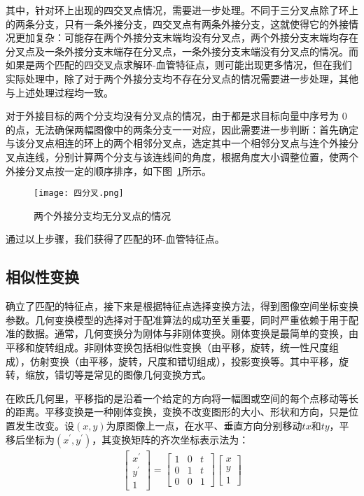 其中，针对环上出现的四交叉点情况，需要进一步处理。不同于三分叉点除了环上的两条分支，只有一条外接分支，四交叉点有两条外接分支，这就使得它的外接情况更加复杂：可能存在两个外接分支末端均没有分叉点，两个外接分支末端均存在分叉点及一条外接分支末端存在分叉点，一条外接分支末端没有分叉点的情况。而如果是两个匹配的四交叉点求解环-血管特征点，则可能出现更多情况，但在我们实际处理中，除了对于两个外接分支均不存在分叉点的情况需要进一步处理，其他与上述处理过程均一致。

对于外接目标的两个分支均没有分叉点的情况，由于都是求目标向量中序号为 0 的点，无法确保两幅图像中的两条分支一一对应，因此需要进一步判断：首先确定与该分叉点相连的环上的两个相邻分叉点，选定其中一个相邻分叉点与连个外接分叉点连线，分别计算两个分支与该连线间的角度，根据角度大小调整位置，使两个外接分叉点按一定的顺序排序，如下图~\ref{4bifur}所示。
   \begin{figure}[ht!]
   \centering
  \texttt{[image: 四分叉.png]}
  \caption{两个外接分支均无分叉点的情况}
  \label{4bifur}
 \end{figure}
通过以上步骤，我们获得了匹配的环-血管特征点。

\subsection{相似性变换}
确立了匹配的特征点，接下来是根据特征点选择变换方法，得到图像空间坐标变换参数。几何变换模型的选择对于配准算法的成功至关重要，同时严重依赖于用于配准的数据。通常，几何变换分为刚体与非刚体变换。刚体变换是最简单的变换，由平移和旋转组成。非刚体变换包括相似性变换（由平移，旋转，统一性尺度组成），仿射变换（由平移，旋转，尺度和错切组成），投影变换等。其中平移，旋转，缩放，错切等是常见的图像几何变换方式。 

在欧氏几何里，平移指的是沿着一个给定的方向将一幅图或空间的每个点移动等长的距离。平移变换是一种刚体变换，变换不改变图形的大小、形状和方向，只是位置发生改变。设$(x,y)$为原图像上一点，在水平、垂直方向分别移动$tx$和$ty$，平移后坐标为$(x^{'},y^{'})$，其变换矩阵的齐次坐标表示法为：
\begin{align}
\left[ \begin{array}{c}
x^{'} \\
y^{'}\\
1   
\end{array} \right]
=
\left[ \begin{array}{ccc}
1 & 0 & t\\
0 & 1 & t \\
0 & 0 & 1
\end{array} \right]
\left[ \begin{array}{c}
x\\
y \\
1
\end{array} \right]
\end{align}

